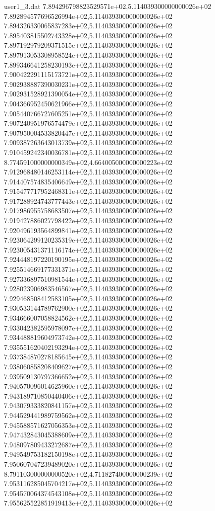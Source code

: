 \begin{filecontents}{user1_3.dat}
7.894296798823529571e+02,5.114039300000000026e+02
7.892894577696526994e+02,5.114039300000000026e+02
7.894326330065837283e+02,5.114039300000000026e+02
7.895403815502743328e+02,5.114039300000000026e+02
7.897192979209371515e+02,5.114039300000000026e+02
7.897913053308958524e+02,5.114039300000000026e+02
7.899346641258230193e+02,5.114039300000000026e+02
7.900422291115173721e+02,5.114039300000000026e+02
7.902938887390030231e+02,5.114039300000000026e+02
7.902931528921390054e+02,5.114039300000000026e+02
7.904366952450621966e+02,5.114039300000000026e+02
7.905440766727605251e+02,5.114039300000000026e+02
7.907240951976574479e+02,5.114039300000000026e+02
7.907950004533820447e+02,5.114039300000000026e+02
7.909387263643013739e+02,5.114039300000000026e+02
7.910459242340036781e+02,5.114039300000000026e+02
8.774591000000000349e+02,4.664005000000000223e+02
7.912968480146253114e+02,5.114039300000000026e+02
7.914407574835406649e+02,5.114039300000000026e+02
7.915477717952468311e+02,5.114039300000000026e+02
7.917288924743777443e+02,5.114039300000000026e+02
7.917986955758683507e+02,5.114039300000000026e+02
7.919427886027798422e+02,5.114039300000000026e+02
7.920496193564899841e+02,5.114039300000000026e+02
7.923064299120235319e+02,5.114039300000000026e+02
7.923005431371116174e+02,5.114039300000000026e+02
7.924448197220190195e+02,5.114039300000000026e+02
7.925514669177331371e+02,5.114039300000000026e+02
7.927336897510981544e+02,5.114039300000000026e+02
7.928023906983546567e+02,5.114039300000000026e+02
7.929468508412583105e+02,5.114039300000000026e+02
7.930533144789762900e+02,5.114039300000000026e+02
7.934666007058824562e+02,5.114039300000000026e+02
7.933042382595978097e+02,5.114039300000000026e+02
7.934488819604973742e+02,5.114039300000000026e+02
7.935551620402193294e+02,5.114039300000000026e+02
7.937384870278185645e+02,5.114039300000000026e+02
7.938060858208409627e+02,5.114039300000000026e+02
7.939509130797366652e+02,5.114039300000000026e+02
7.940570096014625960e+02,5.114039300000000026e+02
7.943189710850440406e+02,5.114039300000000026e+02
7.943079333820841157e+02,5.114039300000000026e+02
7.944529441989759562e+02,5.114039300000000026e+02
7.945588571627056353e+02,5.114039300000000026e+02
7.947432843045388609e+02,5.114039300000000026e+02
7.948097809433272687e+02,5.114039300000000026e+02
7.949549753182150198e+02,5.114039300000000026e+02
7.950607047239489020e+02,5.114039300000000026e+02
8.791103000000000520e+02,4.711827400000000239e+02
7.953116285045704217e+02,5.114039300000000026e+02
7.954570064374543108e+02,5.114039300000000026e+02
7.955625522851919413e+02,5.114039300000000026e+02

\end{filecontents}
